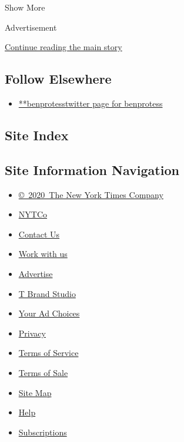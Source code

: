 Show More

Advertisement

\protect\hyperlink{after-mid2}{Continue reading the main story}

\hypertarget{follow-elsewhere}{%
\subsection{Follow Elsewhere}\label{follow-elsewhere}}

\begin{itemize}
\tightlist
\item
  \href{https://twitter.com/benprotess}{**benprotesstwitter page for
  benprotess}
\end{itemize}

\hypertarget{site-index}{%
\subsection{Site Index}\label{site-index}}

\hypertarget{site-information-navigation}{%
\subsection{Site Information
Navigation}\label{site-information-navigation}}

\begin{itemize}
\tightlist
\item
  \href{https://help.nytimes.com/hc/en-us/articles/115014792127-Copyright-notice}{©~2020~The
  New York Times Company}
\end{itemize}

\begin{itemize}
\tightlist
\item
  \href{https://www.nytco.com/}{NYTCo}
\item
  \href{https://help.nytimes.com/hc/en-us/articles/115015385887-Contact-Us}{Contact
  Us}
\item
  \href{https://www.nytco.com/careers/}{Work with us}
\item
  \href{https://nytmediakit.com/}{Advertise}
\item
  \href{http://www.tbrandstudio.com/}{T Brand Studio}
\item
  \href{https://www.nytimes.com/privacy/cookie-policy\#how-do-i-manage-trackers}{Your
  Ad Choices}
\item
  \href{https://www.nytimes.com/privacy}{Privacy}
\item
  \href{https://help.nytimes.com/hc/en-us/articles/115014893428-Terms-of-service}{Terms
  of Service}
\item
  \href{https://help.nytimes.com/hc/en-us/articles/115014893968-Terms-of-sale}{Terms
  of Sale}
\item
  \href{https://spiderbites.nytimes.com}{Site Map}
\item
  \href{https://help.nytimes.com/hc/en-us}{Help}
\item
  \href{https://www.nytimes.com/subscription?campaignId=37WXW}{Subscriptions}
\end{itemize}
